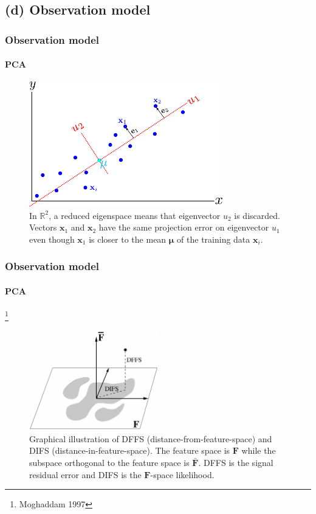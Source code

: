 \subsection{(d) Observation model}
\begin{frame}
\frametitle{Observation model}
\framesubtitle{PCA}
\mypagenum
\begin{figure}
\centering
\includegraphics[width=0.75\textwidth]{thesis/PRML_PCA_problem.pdf}
\caption{In $\mathbb{R}^2$, a reduced eigenspace means that eigenvector $u_2$ is discarded.  Vectors $\mathbf{x}_1$ and $\mathbf{x}_2$ have the same projection error on eigenvector $u_1$ even though $\mathbf{x}_1$ is closer to the mean $\boldsymbol\mu$ of the training data $\mathbf{x}_i$.}
\label{fig:PRML_PCA_problem}
\end{figure}
\end{frame}


\begin{frame}
\frametitle{Observation model}
\framesubtitle{PCA}
\footnote{Moghaddam 1997}
\mypagenum
\begin{figure}[t]
\centering
\includegraphics[width=0.5\textwidth]{thesis/1998_JNL_ProbVisLearning_Moghaddam_fig3.png}
\caption{Graphical illustration of DFFS (distance-from-feature-space) and DIFS (distance-in-feature-space).  The feature space is $\mathbf{F}$ while the subspace orthogonal to the feature space is $\bar{\mathbf{F}}$.  DFFS is the signal residual error and DIFS is the $\mathbf{F}$-space likelihood.}
\label{fig:1997_JNL_DIFSDFFS_Moghaddam}
\end{figure}
\end{frame}


